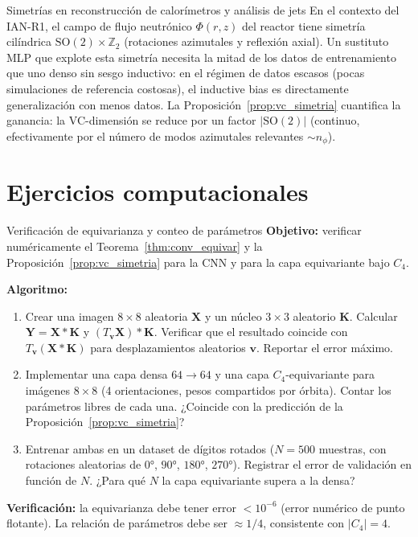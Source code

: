 \begin{estrella}{Simetrías en reconstrucción de calorímetros y análisis de jets}
En el contexto del IAN-R1, el campo de flujo neutrónico $\Phi(r, z)$ del reactor
tiene simetría cilíndrica $\mathrm{SO}(2) \times \mathbb{Z}_2$ (rotaciones
azimutales y reflexión axial). Un sustituto MLP que explote esta simetría
necesita la mitad de los datos de entrenamiento que uno denso sin sesgo
inductivo: en el régimen de datos escasos (pocas simulaciones de referencia
costosas), el inductive bias es directamente generalización con menos datos.
La Proposición~\ref{prop:vc_simetria} cuantifica la ganancia: la VC-dimensión
se reduce por un factor $|\mathrm{SO}(2)|$ (continuo, efectivamente por el
número de modos azimutales relevantes $\sim n_\phi$).
\end{estrella}

\section*{Ejercicios computacionales}

\begin{ejerciciocomp}{Verificación de equivarianza y conteo de parámetros}
\textbf{Objetivo:} verificar numéricamente el Teorema~\ref{thm:conv_equivar}
y la Proposición~\ref{prop:vc_simetria} para la CNN y para la capa equivariante
bajo $C_4$.

\medskip\noindent\textbf{Algoritmo:}
\begin{enumerate}
  \item Crear una imagen $8 \times 8$ aleatoria $\bm{X}$ y un núcleo
        $3 \times 3$ aleatorio $\bm{K}$. Calcular $\bm{Y} = \bm{X} * \bm{K}$
        y $(T_{\bm{v}}\bm{X}) * \bm{K}$. Verificar que el resultado coincide
        con $T_{\bm{v}}(\bm{X} * \bm{K})$ para desplazamientos aleatorios
        $\bm{v}$. Reportar el error máximo.
  \item Implementar una capa densa $64 \to 64$ y una capa $C_4$-equivariante
        para imágenes $8 \times 8$ (4 orientaciones, pesos compartidos por
        órbita). Contar los parámetros libres de cada una. ¿Coincide con la
        predicción de la Proposición~\ref{prop:vc_simetria}?
  \item Entrenar ambas en un dataset de dígitos rotados ($N=500$ muestras,
        con rotaciones aleatorias de $0°$, $90°$, $180°$, $270°$). Registrar
        el error de validación en función de $N$. ¿Para qué $N$ la capa
        equivariante supera a la densa?
\end{enumerate}

\medskip\noindent\textbf{Verificación:} la equivarianza debe tener error
$< 10^{-6}$ (error numérico de punto flotante). La relación de parámetros debe
ser $\approx 1/4$, consistente con $|C_4| = 4$.
\end{ejerciciocomp}

